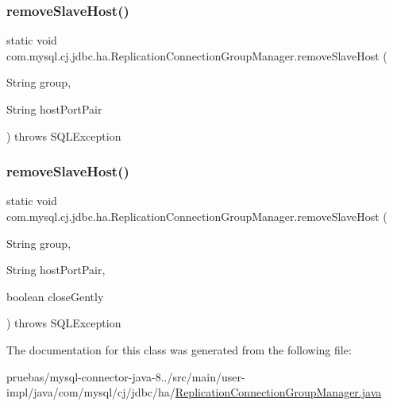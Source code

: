 \subsubsection{\texorpdfstring{remove\+Slave\+Host()}{removeSlaveHost()}\hspace{0.1cm}{\footnotesize\ttfamily [1/2]}}
{\footnotesize\ttfamily static void com.\+mysql.\+cj.\+jdbc.\+ha.\+Replication\+Connection\+Group\+Manager.\+remove\+Slave\+Host (\begin{DoxyParamCaption}\item[{String}]{group,  }\item[{String}]{host\+Port\+Pair }\end{DoxyParamCaption}) throws S\+Q\+L\+Exception\hspace{0.3cm}{\ttfamily [static]}}

\mbox{\label{classcom_1_1mysql_1_1cj_1_1jdbc_1_1ha_1_1_replication_connection_group_manager_a1d8eae072a3cf43947463b98c945dd20}} 
\subsubsection{\texorpdfstring{remove\+Slave\+Host()}{removeSlaveHost()}\hspace{0.1cm}{\footnotesize\ttfamily [2/2]}}
{\footnotesize\ttfamily static void com.\+mysql.\+cj.\+jdbc.\+ha.\+Replication\+Connection\+Group\+Manager.\+remove\+Slave\+Host (\begin{DoxyParamCaption}\item[{String}]{group,  }\item[{String}]{host\+Port\+Pair,  }\item[{boolean}]{close\+Gently }\end{DoxyParamCaption}) throws S\+Q\+L\+Exception\hspace{0.3cm}{\ttfamily [static]}}



The documentation for this class was generated from the following file\+:\begin{DoxyCompactItemize}
\item 
pruebas/mysql-\/connector-\/java-\/8../src/main/user-\/impl/java/com/mysql/cj/jdbc/ha/\mbox{\hyperlink{_replication_connection_group_manager_8java}{Replication\+Connection\+Group\+Manager.\+java}}\end{DoxyCompactItemize}
